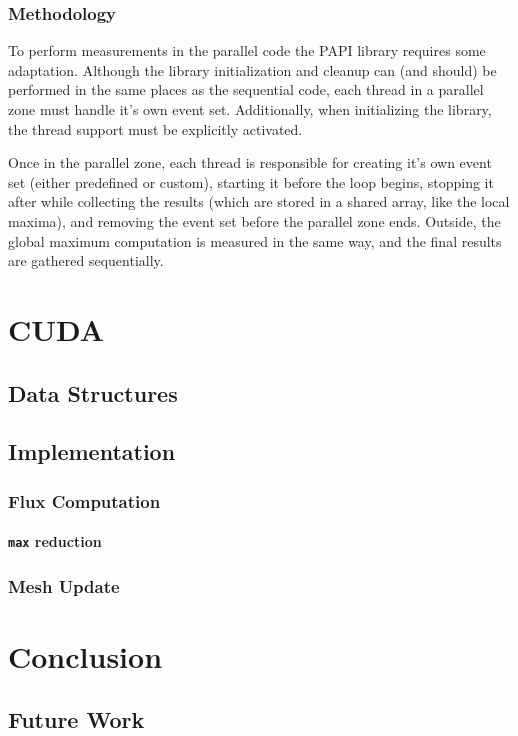 \documentclass[9pt,twocolumn]{scrartcl}
\newcommand{\paragraphh}[1]{\paragraph{#1\hfill}\hfill

}
\begin{document}
\subsubsection{Methodology}%
To perform measurements in the parallel code the PAPI library requires some adaptation. Although the library initialization and cleanup can (and should) be performed in the same places as the sequential code, each thread in a parallel zone must handle it's own event set. Additionally, when initializing the library, the thread support must be explicitly activated.

Once in the parallel zone, each thread is responsible for creating it's own event set (either predefined or custom), starting it before the loop begins, stopping it after while collecting the results (which are stored in a shared array, like the local maxima), and removing the event set before the parallel zone ends. Outside, the global maximum computation is measured in the same way, and the final	 results are gathered sequentially.


\section{CUDA}
\label{sec:cuda}
\subsection{Data Structures}
\subsection{Implementation}
\subsubsection{Flux Computation}
\paragraphh{\texttt{max} reduction}
\subsubsection{Mesh Update}

\section{Conclusion}
\subsection{Future Work}
\end{document}
